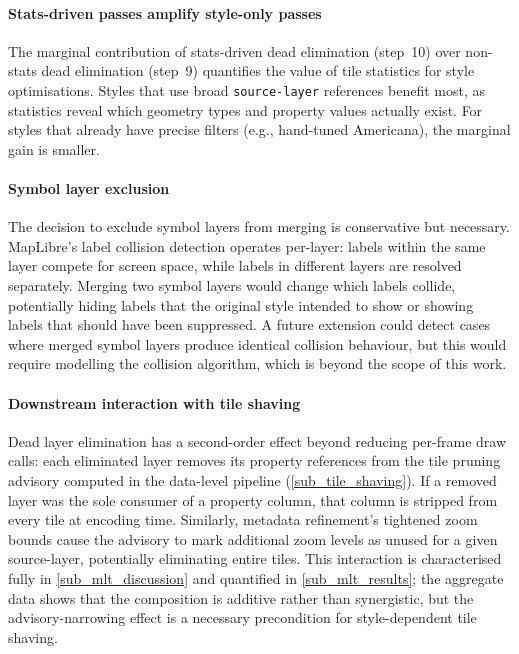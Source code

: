 \paragraph{Stats-driven passes amplify style-only passes}
The marginal contribution of stats-driven dead elimination (step~10) over non-stats dead elimination (step~9) quantifies the value of tile statistics for style optimisations.
Styles that use broad \texttt{source-layer} references benefit most, as statistics reveal which geometry types and property values actually exist.
For styles that already have precise filters (e.g., hand-tuned Americana), the marginal gain is smaller.

\paragraph{Symbol layer exclusion}
The decision to exclude symbol layers from merging is conservative but necessary.
MapLibre's label collision detection operates per-layer: labels within the same layer compete for screen space, while labels in different layers are resolved separately.
Merging two symbol layers would change which labels collide, potentially hiding labels that the original style intended to show or showing labels that should have been suppressed.
A future extension could detect cases where merged symbol layers produce identical collision behaviour, but this would require modelling the collision algorithm, which is beyond the scope of this work.

\paragraph{Downstream interaction with tile shaving}
Dead layer elimination has a second-order effect beyond reducing per-frame draw calls: each eliminated layer removes its property references from the tile pruning advisory computed in the data-level pipeline (\cref{sub_tile_shaving}).
If a removed layer was the sole consumer of a property column, that column is stripped from every tile at encoding time.
Similarly, metadata refinement's tightened zoom bounds cause the advisory to mark additional zoom levels as unused for a given source-layer, potentially eliminating entire tiles.
This interaction is characterised fully in \cref{sub_mlt_discussion} and quantified in \cref{sub_mlt_results}; the aggregate data shows that the composition is additive rather than synergistic, but the advisory-narrowing effect is a necessary precondition for style-dependent tile shaving.


